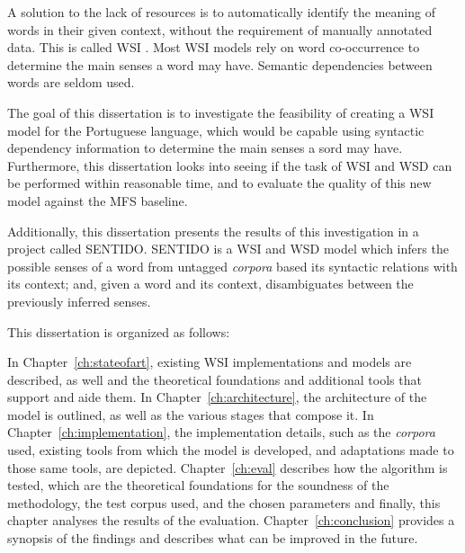 A solution to the lack of resources is to automatically identify the meaning of
words in their given context, without the requirement of manually annotated
data. This is called \ac{WSI} \citep{agirre2007semeval}. Most \ac{WSI} models 
rely on word co-occurrence to determine the main senses a word may have. 
Semantic dependencies between words are seldom used.



The goal of this dissertation is to investigate the feasibility of creating a
\ac{WSI} model for the Portuguese language, which would be capable using 
syntactic dependency information to determine the main senses a sord may have. 
Furthermore, this dissertation looks into seeing if the task of \ac{WSI} and 
\ac{WSD} can be performed within reasonable time, and to evaluate the quality 
of this new model against the \ac{MFS} baseline.


Additionally, this dissertation presents the results of this investigation in
a project called \ac{SENTIDO}. \ac{SENTIDO} is a \ac{WSI} and \ac{WSD} model
which infers the possible senses of a word from untagged \emph{corpora} based
its syntactic relations with its context; and, given a word and its context, 
disambiguates between the previously inferred senses.


This dissertation is organized as follows:

In Chapter~\ref{ch:stateofart}, existing \ac{WSI} implementations and models
are described, as well and the theoretical foundations and additional tools
that support and aide them. In Chapter~\ref{ch:architecture}, the architecture
of the model is outlined, as well as the various stages that compose it. In
Chapter~\ref{ch:implementation}, the implementation details, such as the
\emph{corpora} used, existing tools from which the model is developed, and
adaptations made to those same tools, are depicted.
Chapter~\ref{ch:eval} describes how the algorithm is tested, which are the
theoretical foundations for the soundness of the methodology, the test corpus
used, and the chosen parameters and finally, this chapter analyses the results 
of the evaluation. Chapter~\ref{ch:conclusion} provides a synopsis of the 
findings and describes what can be improved in the future.

